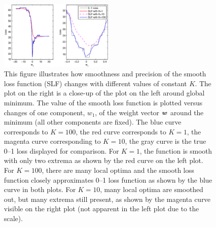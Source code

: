 \begin{figure}[here]
\includegraphics[width=0.50\textwidth]{images/fig53_smoothfunction.eps}
\caption{
This figure illustrates how smoothness and precision of the smooth loss function (SLF) changes with different values of constant $K$. The plot on the right is a close-up of the plot on the left around global minimum. The value of the smooth loss function is plotted versus changes of one component, $w_1$, of the weight vector $\boldsymbol{w}$ around the minimum (all other components are fixed). The blue curve corresponds to $K=100$, the red curve corresponds to $K=1$, the magenta curve corresponding to $K=10$, the gray curve is the true 0--1 loss displayed for comparison. For $K=1$, the function is smooth with only two extrema as shown by the red curve on the left plot. For $K=100$, there are many local optima and the smooth loss function closely approximates 0--1 loss function as shown by the blue curve in both plots. For $K=10$, many local optima are smoothed out, but many extrema still present, as shown by the magenta curve visible on the right plot (not apparent in the left plot due to the scale).
}
\label{fig:sla.smoothfunction}
\end{figure}

